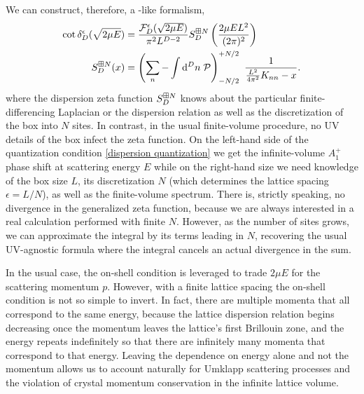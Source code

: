 We can construct, therefore, a \Luscher-like formalism,
\begin{align}
    \label{eq:dispersion quantization}
    \cot \delta_D^{\epsilon}( \sqrt{2 \mu E} ) &= \frac{\mathcal{F}_D^\epsilon(\sqrt{2 \mu E})}{\pi^2 L^{D-2}} S^{\boxplus N}_{D}\left(\frac{2\mu E L^2}{(2\pi)^2}\right)
    \\
    \label{eq:dispersion S}
    S^{\boxplus N}_{D}( x )
    &=
    \left(\sum_n - \int \mathrm{d}^D n\; \mathcal{P} \right)_{-N/2}^{+N/2}\  \frac{1}{ \frac{L^2}{4\pi^2}K_{nn} - x}.
\end{align}
where the dispersion zeta function $S^{\boxplus N}_{D}$ knows about the particular finite-differencing Laplacian or the dispersion relation as well as the discretization of the box into $N$ sites.
In contrast, in the usual finite-volume procedure, no UV details of the box infect the zeta function.
On the left-hand side of the quantization condition \eqref{dispersion quantization} we get the infinite-volume $A_1^+$ phase shift at scattering energy $E$ while on the right-hand size we need knowledge of the box size $L$, its discretization $N$ (which determines the lattice spacing $\epsilon=L/N$), as well as the finite-volume spectrum.
There is, strictly speaking, no divergence in the generalized zeta function, because we are always interested in a real calculation performed with finite $N$.
However, as the number of sites grows, we can approximate the integral by its terms leading in $N$, recovering the usual UV-agnostic formula where the integral cancels an actual divergence in the sum.

In the usual case, the on-shell condition is leveraged to trade $2\mu E$ for the scattering momentum $p$.  However, with a finite lattice spacing the on-shell condition is not so simple to invert.
In fact, there are multiple momenta that all correspond to the same energy, because the lattice dispersion relation begins decreasing once the momentum leaves the lattice's first Brillouin zone, and the energy repeats indefinitely so that there are infinitely many momenta that correspond to that energy.
Leaving the dependence on energy alone and not the momentum allows us to account naturally for Umklapp scattering processes and the violation of crystal momentum conservation in the infinite lattice volume.

